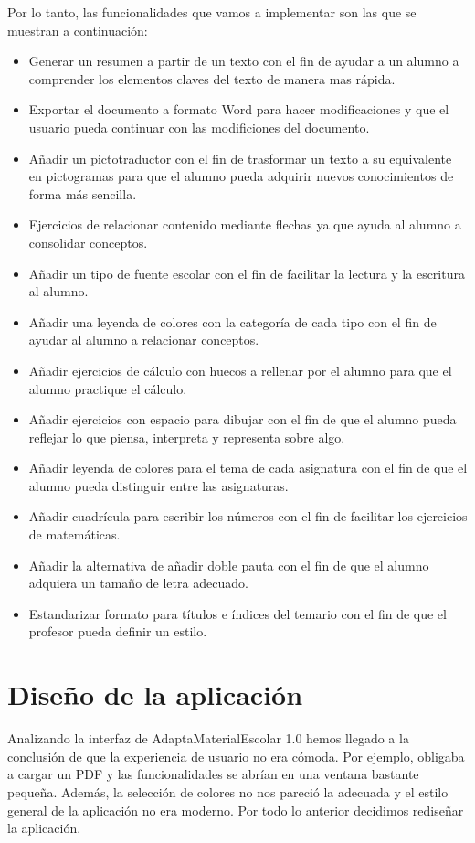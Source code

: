 Por lo tanto, las funcionalidades que vamos a implementar son las que se muestran a continuación:

\begin{itemize}
  \item Generar un resumen a partir de un texto con el fin de ayudar a un alumno a comprender los elementos claves del texto de manera mas rápida.
  \item Exportar el documento a formato Word para hacer modificaciones y que el usuario pueda continuar con las modificiones del documento.
  \item Añadir un pictotraductor con el fin de trasformar un texto a su equivalente en pictogramas para que el alumno pueda adquirir nuevos conocimientos de forma más sencilla.
  \item Ejercicios de relacionar contenido mediante flechas ya que ayuda al alumno a consolidar conceptos.
  \item Añadir un tipo de fuente escolar con el fin de facilitar la lectura y la escritura al alumno.
  \item Añadir una leyenda de colores con la categoría de cada tipo con el fin de  ayudar al alumno a relacionar conceptos.
  \item  Añadir ejercicios de cálculo con huecos a rellenar por el alumno para que el alumno practique el cálculo.
  \item  Añadir ejercicios con espacio para dibujar con el fin de que el alumno pueda reflejar lo que piensa, interpreta y representa sobre algo.
  \item Añadir leyenda de colores para el tema de cada asignatura con el fin de que el alumno pueda distinguir entre las asignaturas.
  \item Añadir cuadrícula para escribir los números con el fin de facilitar los ejercicios de matemáticas.
  \item Añadir la alternativa de añadir doble pauta con el fin de que el alumno adquiera un tamaño de letra adecuado.
  \item Estandarizar formato para títulos e índices del temario con el fin de que el profesor pueda definir un estilo.

\end{itemize}

\section{Diseño de la aplicación}
\label{disenyoDeLaAplicacion}
Analizando la interfaz de AdaptaMaterialEscolar 1.0 hemos llegado a la conclusión de que la experiencia de usuario no era cómoda. Por ejemplo, obligaba a cargar un PDF y las funcionalidades se abrían en una ventana bastante pequeña. Además, la selección de colores no nos pareció la adecuada y el estilo general de la aplicación no era moderno. Por todo lo anterior decidimos rediseñar la aplicación.

